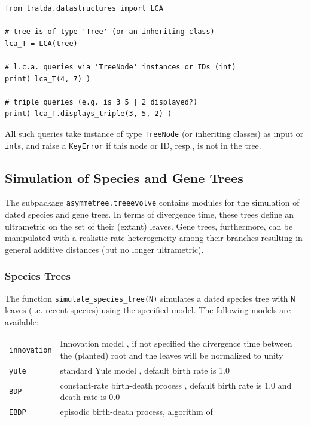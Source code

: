 \documentclass[hidelinks,11pt]{article}
\newcommand{\sq}{\textquotesingle}
\begin{document}
\begin{adjustwidth}{1cm}{1cm}\vspace{2mm}
\begin{verbatim}
from tralda.datastructures import LCA

# tree is of type 'Tree' (or an inheriting class)
lca_T = LCA(tree)

# l.c.a. queries via 'TreeNode' instances or IDs (int)
print( lca_T(4, 7) )

# triple queries (e.g. is 3 5 | 2 displayed?)
print( lca_T.displays_triple(3, 5, 2) )
\end{verbatim}
\end{adjustwidth}
All such queries take instance of type \texttt{TreeNode} (or inheriting 
classes) as 
input or \texttt{int}s, and raise a \texttt{KeyError} if this node or ID, 
resp., is not in the tree.

\subsection{Simulation of Species and Gene Trees}

The subpackage \texttt{asymmetree.treeevolve} contains modules for the simulation of dated species and gene trees.
In terms of divergence time, these trees define an ultrametric on the set of their (extant) leaves.
Gene trees, furthermore, can be manipulated with a realistic rate heterogeneity 
among their branches resulting in general additive distances (but no longer 
ultrametric).


\subsubsection{Species Trees}

The function \texttt{simulate\_species\_tree(N)} simulates a dated species tree with \texttt{N} leaves (i.e. recent species) using the specified model.
The following models are available:

\vspace{3mm}
{\small\centering
	\begin{longtable}{ p{3.5cm} p{10cm} }
		\texttt{\sq innovation\sq} & Innovation model \citet{keller-schmidt2012},
		if not specified the divergence time between the (planted) root and the
		leaves will be normalized to unity\\
		\texttt{\sq yule\sq}  & standard Yule model \citep{yule1924}, default birth
		rate is 1.0 \\
		\texttt{\sq BDP\sq} & constant-rate birth-death process \citep[see
		e.g.][]{kendall1948,hagen2018}, default birth rate is 1.0 and death rate is
		0.0 \\
		\texttt{\sq EBDP\sq} & episodic birth-death process, algorithm of
		\cite{stadler2011} \\
	\end{longtable}
}
\vspace{3mm}
\end{document}
